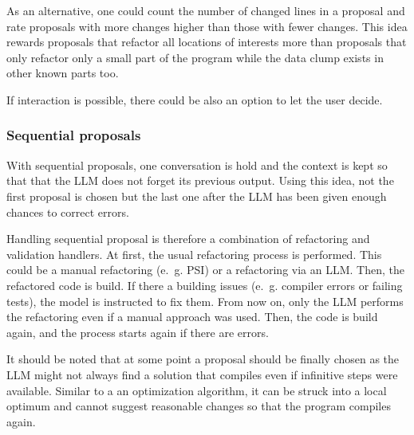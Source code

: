 As an alternative, one could count the number of changed lines in a proposal and rate proposals with more changes higher than those with fewer changes. This idea rewards proposals that refactor all locations of interests more than proposals that only refactor only a small part of the program while the data clump exists in other known parts too. 


If interaction is possible, there could be also an option to let the user decide.
\subsubsection{Sequential proposals}

With sequential proposals, one conversation is hold and the context is kept so that that the \ac{LLM} does not forget its previous output. Using this idea, not the first proposal is chosen but the last one after the \ac{LLM} has been given enough chances to correct errors.

Handling sequential proposal is therefore a combination of refactoring and validation handlers. At first, the usual refactoring process is performed. This could be a manual refactoring (e.~g. PSI) or a refactoring via an \ac{LLM}. Then, the refactored code is build. If there a building issues (e.~g. compiler errors or failing tests), the model is instructed to fix them. From now on, only the \ac{LLM} performs the refactoring even if a manual approach was used. Then, the code is build again, and the process starts again if there are errors. 



It should be noted that at some point a proposal should be finally chosen as the \ac{LLM} might not always find a solution that compiles even if infinitive steps were available. Similar to a an optimization algorithm, it can be struck into a local optimum and cannot suggest reasonable changes so that the program compiles again.  